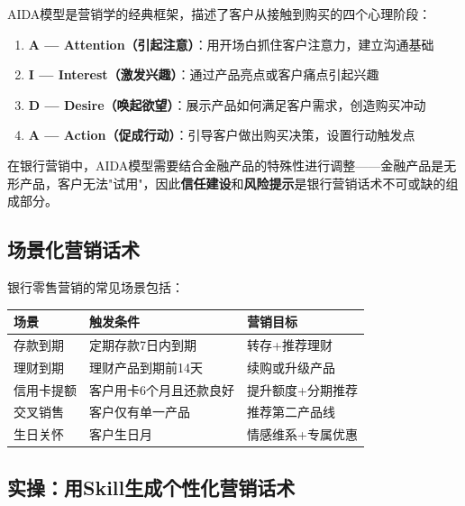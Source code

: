 AIDA模型是营销学的经典框架，描述了客户从接触到购买的四个心理阶段：

\begin{enumerate}[leftmargin=2em]
  \item \textbf{A --- Attention（引起注意）}：用开场白抓住客户注意力，建立沟通基础
  \item \textbf{I --- Interest（激发兴趣）}：通过产品亮点或客户痛点引起兴趣
  \item \textbf{D --- Desire（唤起欲望）}：展示产品如何满足客户需求，创造购买冲动
  \item \textbf{A --- Action（促成行动）}：引导客户做出购买决策，设置行动触发点
\end{enumerate}

在银行营销中，AIDA模型需要结合金融产品的特殊性进行调整——金融产品是无形产品，客户无法"试用"，因此\textbf{信任建设}和\textbf{风险提示}是银行营销话术不可或缺的组成部分。

\subsection{场景化营销话术}

银行零售营销的常见场景包括：

\begin{table}[H]
\centering
\begin{tabular}{lp{4cm}p{5cm}}
\toprule
\textbf{场景} & \textbf{触发条件} & \textbf{营销目标} \\
\midrule
存款到期 & 定期存款7日内到期 & 转存+推荐理财 \\
理财到期 & 理财产品到期前14天 & 续购或升级产品 \\
信用卡提额 & 客户用卡6个月且还款良好 & 提升额度+分期推荐 \\
交叉销售 & 客户仅有单一产品 & 推荐第二产品线 \\
生日关怀 & 客户生日月 & 情感维系+专属优惠 \\
\bottomrule
\end{tabular}
\end{table}

\subsection{实操：用Skill生成个性化营销话术}

